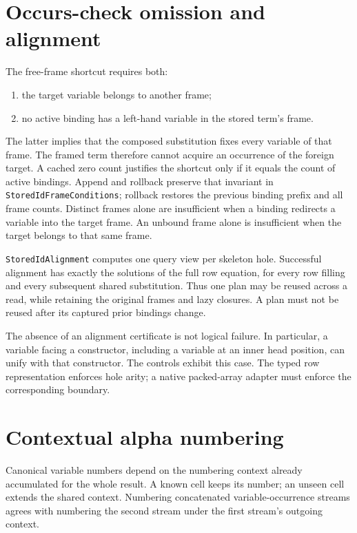 \documentclass[11pt,a4paper]{article}
\newcommand{\code}[1]{\nolinkurl{#1}}
\begin{document}
\section{Occurs-check omission and alignment}

The free-frame shortcut requires both:
\begin{enumerate}
\item the target variable belongs to another frame;
\item no active binding has a left-hand variable in the stored term's frame.
\end{enumerate}
The latter implies that the composed substitution fixes every variable of
that frame. The framed term therefore cannot acquire an occurrence of the
foreign target. A cached zero count justifies the shortcut only if it equals
the count of active bindings. Append and rollback preserve that invariant in
\code{StoredIdFrameConditions}; rollback restores the previous binding prefix
and all frame counts. Distinct frames alone are insufficient when a binding
redirects a variable into the target frame. An unbound frame alone is
insufficient when the target belongs to that same frame.

\code{StoredIdAlignment} computes one query view per skeleton hole. Successful
alignment has exactly the solutions of the full row equation, for every row
filling and every subsequent shared substitution. Thus one plan may be reused
across a read, while retaining the original frames and lazy closures. A plan
must not be reused after its captured prior bindings change.

The absence of an alignment certificate is not logical failure. In particular,
a variable facing a constructor, including a variable at an inner head
position, can unify with that constructor. The controls exhibit this case.
The typed row representation enforces hole arity; a native packed-array
adapter must enforce the corresponding boundary.

\section{Contextual alpha numbering}

Canonical variable numbers depend on the numbering context already accumulated
for the whole result. A known cell keeps its number; an unseen cell extends
the shared context. Numbering concatenated variable-occurrence streams agrees
with numbering the second stream under the first stream's outgoing context.
\end{document}
